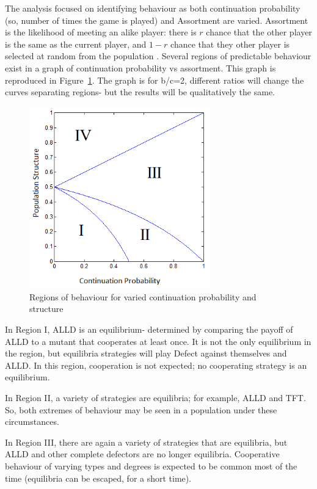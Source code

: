 \documentclass[a4paper,11pt]{article}
\begin{document}
The analysis focused on identifying behaviour as both continuation probability (so, number of times the game is played) and Assortment are varied. Assortment is the likelihood of meeting an alike player: there is $r$ chance that the other player is the same as the current player, and $1-r$ chance that they other player is selected at random from the population \citep{eshel:PNAS:1982}. Several regions of predictable behaviour exist in a graph of continuation probability vs assortment. This graph is reproduced in Figure~\ref{fig:regions}. The graph is for b/c=2, different ratios will change the curves separating regions- but the results will be qualitatively the same. 

\begin{figure}[h!]
\centering
\includegraphics[width=0.7\textwidth]{regions}
\caption{Regions of behaviour for varied continuation probability and structure}
\label{fig:regions}
\end{figure}

In Region I, ALLD is an equilibrium- determined by comparing the payoff of ALLD to a mutant that cooperates at least once. It is not the only equilibrium in the region, but equilibria strategies will play Defect against themselves and ALLD. In this region, cooperation is not expected; no cooperating strategy is an equilibrium.

In Region II, a variety of strategies are equilibria; for example, ALLD and TFT. So, both extremes of behaviour may be seen in a population under these circumstances. 

In Region III, there are again a variety of strategies that are equilibria, but ALLD and other complete defectors are no longer equilibria. Cooperative behaviour of varying types and degrees is expected to be common most of the time (equilibria can be escaped, for a short time).
\end{document}
